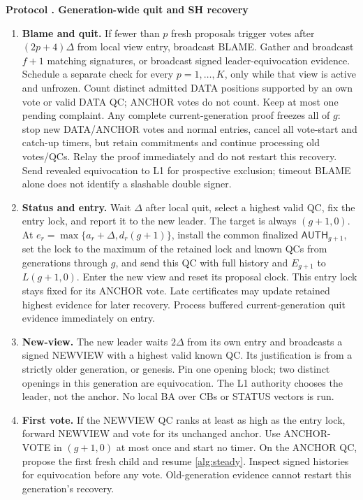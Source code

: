 \documentclass[11pt,a4paper]{article}
\newcommand{\RR}[1]{{\color{rrRed}#1}}
\newcommand{\tagg}[1]{\mathsf{#1}}
\newcounter{protocol}
\newenvironment{protocol}[2]{\refstepcounter{protocol}\label{#1}
\begin{mdframed}[nobreak=true,linewidth=.6pt,skipabove=8pt,skipbelow=8pt,
innertopmargin=7pt,innerbottommargin=7pt]\small
\textbf{Protocol \theprotocol. #2}\par\smallskip}{\end{mdframed}}
\begin{document}
\begin{protocol}{alg:recovery}{Generation-wide quit and SH recovery}
\begin{enumerate}[label=\textbf{\roman*)},itemsep=5pt]
\item \textbf{Blame and quit.} If fewer than $p$ fresh proposals trigger
votes after $(2p+4)\Delta$ from local view entry, broadcast BLAME.
Gather and broadcast $f+1$ matching signatures, or broadcast signed
leader-equivocation evidence.
\RR{Schedule a separate check for every $p=1,\ldots,K$, only while that
view is active and unfrozen. Count distinct admitted DATA positions
supported by an own vote or valid DATA QC; ANCHOR votes do not count.
Keep at most one pending complaint. Any complete current-generation
proof freezes all of $g$: stop new DATA/ANCHOR votes and normal entries,
cancel all vote-start and catch-up timers, but retain commitments and
continue processing old votes/QCs. Relay the proof immediately and do
not restart this recovery. Send revealed equivocation to L1 for prospective
exclusion; timeout BLAME alone does not identify a slashable double signer.}
\item \textbf{Status and entry.} Wait $\Delta$ after local quit, select a
highest valid QC, fix the entry lock, and report it to the new leader.
\RR{The target is always $(g+1,0)$. At
$e_r=\max\{a_r+\Delta,d_r(g+1)\}$, install the common finalized
$\tagg{AUTH}_{g+1}$, set the lock to the maximum of the retained lock
and known QCs from generations through $g$, and send this QC with full
history and $E_{g+1}$ to $L(g+1,0)$. Enter the new view and reset its
proposal clock. This entry lock stays fixed for its ANCHOR vote.
Late certificates may update retained highest evidence for later recovery.
Process buffered current-generation quit evidence immediately on entry.}
\item \textbf{New-view.} The new leader waits $2\Delta$ from its own
entry and broadcasts a signed NEWVIEW with a highest valid known QC.
\RR{Its justification is from a strictly older generation, or genesis.
Pin one opening block; two distinct openings in this generation are
equivocation. The L1 authority chooses the leader, not the anchor.
No local BA over CBs or STATUS vectors is run.}
\item \textbf{First vote.} If the NEWVIEW QC ranks at least as high as the
entry lock, forward NEWVIEW and vote for its unchanged anchor.
\RR{Use ANCHOR-VOTE in $(g+1,0)$ at most once and start no timer.
On the ANCHOR QC, propose the first fresh child and resume
\cref{alg:steady}. Inspect signed histories for equivocation before any
vote. Old-generation evidence cannot restart this generation's recovery.}
\end{enumerate}
\end{protocol}
\end{document}
